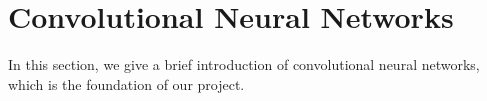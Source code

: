 \documentclass{article} %
\begin{document}
\par
\section{Convolutional Neural Networks}
In this section, we give a brief introduction of convolutional neural networks, which is the foundation of our project.
\end{document}
